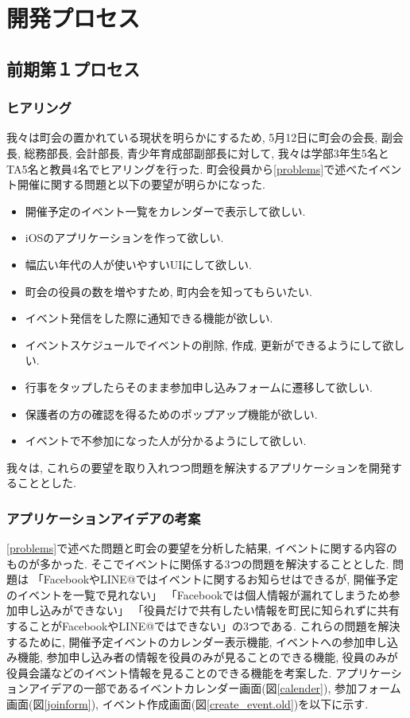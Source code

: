 \chapter{開発プロセス}

\section{前期第１プロセス}

\subsection{ヒアリング}
我々は町会の置かれている現状を明らかにするため,
5月12日に町会の会長, 副会長, 総務部長, 会計部長, 青少年育成部副部長に対して,
我々は学部3年生5名とTA5名と教員4名でヒアリングを行った.
町会役員から\ref{problems}で述べたイベント開催に関する問題と以下の要望が明らかになった.

\begin{itemize}
\item 開催予定のイベント一覧をカレンダーで表示して欲しい.
\item iOSのアプリケーションを作って欲しい.
\item 幅広い年代の人が使いやすいUIにして欲しい.
\item 町会の役員の数を増やすため, 町内会を知ってもらいたい.
\item イベント発信をした際に通知できる機能が欲しい.
\item イベントスケジュールでイベントの削除, 作成, 更新ができるようにして欲しい.
\item 行事をタップしたらそのまま参加申し込みフォームに遷移して欲しい.
\item 保護者の方の確認を得るためのポップアップ機能が欲しい.
\item イベントで不参加になった人が分かるようにして欲しい.
\end{itemize}

我々は, これらの要望を取り入れつつ問題を解決するアプリケーションを開発することとした.


\subsection{アプリケーションアイデアの考案}
\ref{problems}で述べた問題と町会の要望を分析した結果, イベントに関する内容のものが多かった.
そこでイベントに関係する3つの問題を解決することとした. 問題は
「FacebookやLINE@ではイベントに関するお知らせはできるが, 開催予定のイベントを一覧で見れない」
「Facebookでは個人情報が漏れてしまうため参加申し込みができない」
「役員だけで共有したい情報を町民に知られずに共有することがFacebookやLINE@ではできない」の3つである.
これらの問題を解決するために, 開催予定イベントのカレンダー表示機能,
イベントへの参加申し込み機能, 参加申し込み者の情報を役員のみが見ることのできる機能,
役員のみが役員会議などのイベント情報を見ることのできる機能を考案した.
アプリケーションアイデアの一部であるイベントカレンダー画面(図\ref{calender}),
参加フォーム画面(図\ref{joinform}), イベント作成画面(図\ref{create_event.old})を以下に示す.

